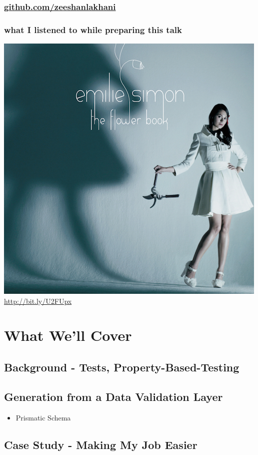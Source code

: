 \documentclass[11pt]{article}
\begin{document}
\subsubsection{\href{https://github.com/zeeshanlakhani}{github.com/zeeshanlakhani}}
\label{sec-3-1-4}
\subsubsection{what I listened to while preparing this talk}
\label{sec-3-1-5}
\includegraphics[width=.9\linewidth]{../images/listen.jpg}
\url{http://bit.ly/U2FUpx}
\section{What We'll Cover}
\label{sec-4}
\subsection{Background - Tests, Property-Based-Testing}
\label{sec-4-1}
\subsection{Generation from a Data Validation Layer}
\label{sec-4-2}
\begin{itemize}
\item Prismatic Schema
\end{itemize}
\subsection{Case Study - Making My Job Easier}
\label{sec-4-3}
\end{document}
